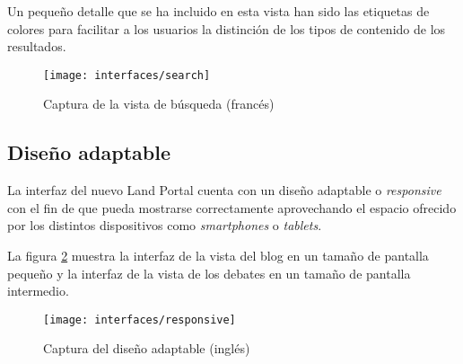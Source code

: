 Un pequeño detalle que se ha incluido en esta vista han sido las etiquetas de colores para facilitar a los usuarios la distinción de los tipos de contenido de los resultados.
\begin{figure}[h]
	\centering
	\texttt{[image: interfaces/search]}
	\caption{Captura de la vista de búsqueda (francés)}
	\label{fig:interface_busqued}
\end{figure}


\subsection{Diseño adaptable}
La interfaz del nuevo Land Portal cuenta con un diseño adaptable o \textit{responsive} con el fin de que pueda mostrarse correctamente aprovechando el espacio ofrecido por los distintos dispositivos como \textit{smartphones} o \textit{tablets}.

La figura \ref{fig:interface_responsive} muestra la interfaz de la vista del blog en un tamaño de pantalla pequeño y la interfaz de la vista de los debates en un tamaño de pantalla intermedio.

\begin{figure}[h]
	\centering
	\texttt{[image: interfaces/responsive]}
	\caption{Captura del diseño adaptable (inglés)}
	\label{fig:interface_responsive}
\end{figure}